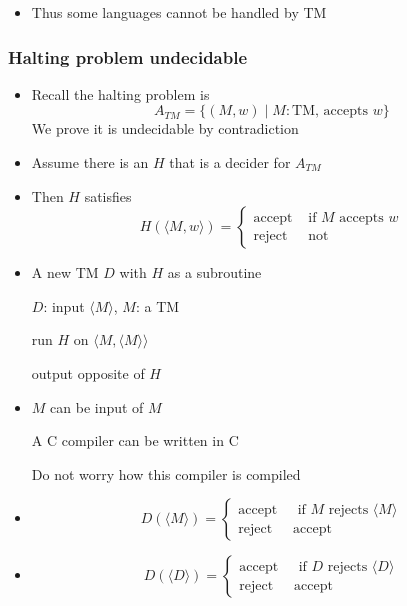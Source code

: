 \begin{frame}[allowframebreaks]
\begin{itemize}
\item Thus some languages cannot be handled by TM
\end{itemize}\end{frame} \begin{frame}[allowframebreaks] \frametitle{Halting problem undecidable}
  \begin{itemize}
\item Recall the halting problem is
  \begin{equation*}
A_{TM}
=\{(M,w)\mid M: \mbox{TM, accepts } w\}
\end{equation*}
We prove it is undecidable
by contradiction
\item Assume there is an $H$ that is a decider for $A_{TM}$
\item [] Then $H$ satisfies
  \begin{equation*}
    H(\langle  M,w\rangle )=
    \begin{cases}
      \mbox{accept} & \mbox{ if } M \mbox{ accepts } w\\
\mbox{reject} & \mbox{ not}
    \end{cases}
  \end{equation*}
\item A new TM $D$ with $H$ as a subroutine

$D$: input $\langle  M\rangle $, $M$: a TM

run $H$ on $\langle  M,\langle  M\rangle \rangle $

output opposite of $H$

\item $M$ can be input of $M$

A C compiler can be written in C

Do not worry how this compiler is compiled


\item 
  \begin{equation*}
    D(\langle  M\rangle )
=
\begin{cases}
  \mbox{accept } & 
\mbox{ if } M \mbox{ rejects } \langle  M\rangle \\
\mbox{reject} & \mbox{accept}
\end{cases}
  \end{equation*}

\item 
  \begin{equation*}
    D(\langle  D\rangle )
=
\begin{cases}
  \mbox{accept } & 
\mbox{ if } D \mbox{ rejects } \langle  D\rangle \\
\mbox{reject} & \mbox{accept}
\end{cases}
  \end{equation*}


\end{itemize}
\end{frame}
